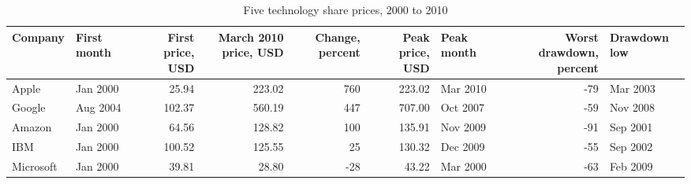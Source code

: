 \begin{table}
\caption{Five technology share prices, 2000 to 2010}
\begin{tabular}{llrrrrlrl}
\toprule
Company & First month & First price, USD & March 2010 price, USD & Change, percent & Peak price, USD & Peak month & Worst drawdown, percent & Drawdown low \\
\midrule
Apple & Jan 2000 & 25.94 & 223.02 & {\cellcolor[HTML]{00441B}} \color[HTML]{F1F1F1} 760 & 223.02 & Mar 2010 & {\cellcolor[HTML]{E43027}} \color[HTML]{F1F1F1} -79 & Mar 2003 \\
Google & Aug 2004 & 102.37 & 560.19 & {\cellcolor[HTML]{4AAF61}} \color[HTML]{F1F1F1} 447 & 707.00 & Oct 2007 & {\cellcolor[HTML]{FEE6DA}} \color[HTML]{000000} -59 & Nov 2008 \\
Amazon & Jan 2000 & 64.56 & 128.82 & {\cellcolor[HTML]{DCF2D7}} \color[HTML]{000000} 100 & 135.91 & Nov 2009 & {\cellcolor[HTML]{67000D}} \color[HTML]{F1F1F1} -91 & Sep 2001 \\
IBM & Jan 2000 & 100.52 & 125.55 & {\cellcolor[HTML]{EDF8EA}} \color[HTML]{000000} 25 & 130.32 & Dec 2009 & {\cellcolor[HTML]{FFF5F0}} \color[HTML]{000000} -55 & Sep 2002 \\
Microsoft & Jan 2000 & 39.81 & 28.80 & {\cellcolor[HTML]{F7FCF5}} \color[HTML]{000000} -28 & 43.22 & Mar 2000 & {\cellcolor[HTML]{FCC3AB}} \color[HTML]{000000} -63 & Feb 2009 \\
\bottomrule
\end{tabular}
\end{table}
